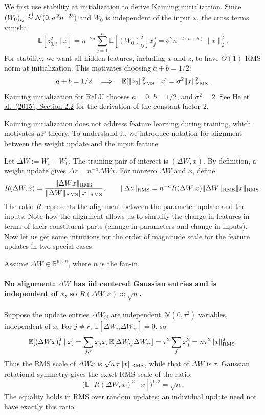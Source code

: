 We first use stability at initialization to derive Kaiming initialization.
Since $(W_0)_{ij}\overset{\rm iid}{\sim}\mathcal N(0,\sigma^2n^{-2b})$
and $W_0$ is independent of the input $x$, the cross terms vanish:
\[
 \mathbb E[z_{0,i}^2\mid x]
 =n^{-2a}\sum_{j=1}^n\mathbb E[(W_0)_{ij}^2]x_j^2
 =\sigma^2n^{-2(a+b)}\|x\|_2^2.
\]
For stability, we want all hidden features, including $x$ and $z$, to have
$\Theta(1)$ RMS norm at initialization. This motivates choosing $a+b=1/2$:
\[
 a+b=1/2\quad\Longrightarrow\quad
 \mathbb E[\|z_0\|_{\rm RMS}^2\mid x]
 =\sigma^2\|x\|_{\rm RMS}^2.
\]
Kaiming initialization for ReLU chooses $a=0$, $b=1/2$, and $\sigma^2=2$.
See \href{https://openaccess.thecvf.com/content_iccv_2015/html/He_Delving_Deep_into_ICCV_2015_paper.html}{He et al.\ (2015), Section 2.2}
for the derivation of the constant factor $2$.

Kaiming initialization does not address feature learning during training,
which motivates $\mu$P theory. To understand it, we introduce notation for
alignment between the weight update and the input feature.

Let $\Delta W := W_{t}-W_{0}$. The training pair of interest is $(\Delta W,x)$. By definition, a weight update gives $\Delta z=n^{-a}\Delta W x$. For nonzero
$\Delta W$ and $x$, define
\[
 R(\Delta W,x)=\frac{\|\Delta W x\|_{\rm RMS}}
 {\|\Delta W\|_{\rm RMS}\|x\|_{\rm RMS}},\qquad
 \|\Delta z\|_{\rm RMS}
 =n^{-a}R(\Delta W,x)\|\Delta W\|_{\rm RMS}\|x\|_{\rm RMS}.
\]
The ratio $R$ represents the alignment between the parameter update and the inputs. Note how the alignment allows us to simplify the change in features in terms of their constituent parts (change in parameters and change in inputs). Now let us get some intuitions for the order of magnitude scale for the feature updates in two special cases.

Assume $\Delta W\in\mathbb R^{p\times n}$, where $n$ is the fan-in.

\paragraph{No alignment: $\Delta W$ has iid centered Gaussian entries and is independent of $x$, so $R(\Delta W,x)\approx\sqrt{n}$.}
Suppose the update entries $\Delta W_{ij}$ are independent
$\mathcal N(0,\tau^2)$ variables, independent of $x$.
For $j\ne r$, $\mathbb E[\Delta W_{ij}\Delta W_{ir}]=0$, so
\[
 \mathbb E[(\Delta W x)_i^2\mid x]
 =\sum_{j,r}x_jx_r\mathbb E[\Delta W_{ij}\Delta W_{ir}]
 =\tau^2\sum_jx_j^2 =n\tau^2\|x\|_{\rm RMS}^2.
\]
Thus the RMS scale of $\Delta W x$ is $\sqrt{n}\,\tau\|x\|_{\rm RMS}$,
while that of $\Delta W$ is $\tau$. Gaussian rotational symmetry gives
the exact RMS scale of the ratio:
\[
 \bigl(\mathbb E[R(\Delta W,x)^2\mid x]\bigr)^{1/2}=\sqrt{n}.
\]
The equality holds in RMS over random updates; an individual update need not
have exactly this ratio.

